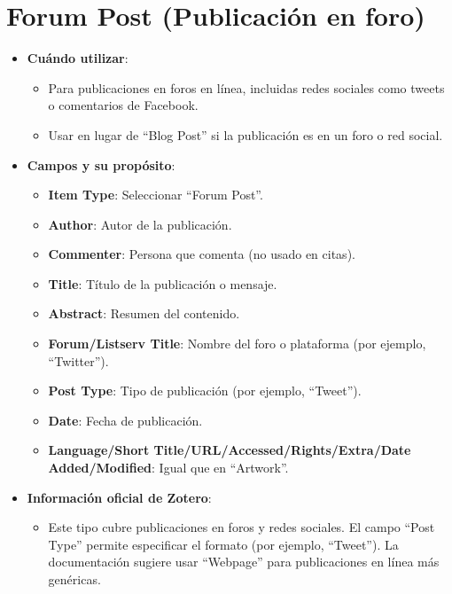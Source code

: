 \documentclass[
  jou,
  floatsintext,
  longtable,
  a4paper,
  nolmodern,
  notxfonts,
  notimes,
  12pt,
  colorlinks=true,linkcolor=blue,citecolor=blue,urlcolor=blue]{apa7}
\providecommand{\tightlist}{%
  \setlength{\itemsep}{0pt}\setlength{\parskip}{0pt}}
\begin{document}
\section{Forum Post (Publicación en
foro)}\label{forum-post-publicaciuxf3n-en-foro}

\begin{itemize}
\tightlist
\item
  \textbf{Cuándo utilizar}:

  \begin{itemize}
  \tightlist
  \item
    Para publicaciones en foros en línea, incluidas redes sociales como
    tweets o comentarios de Facebook.
  \item
    Usar en lugar de ``Blog Post'' si la publicación es en un foro o red
    social.
  \end{itemize}
\item
  \textbf{Campos y su propósito}:

  \begin{itemize}
  \tightlist
  \item
    \textbf{Item Type}: Seleccionar ``Forum Post''.
  \item
    \textbf{Author}: Autor de la publicación.
  \item
    \textbf{Commenter}: Persona que comenta (no usado en citas).
  \item
    \textbf{Title}: Título de la publicación o mensaje.
  \item
    \textbf{Abstract}: Resumen del contenido.
  \item
    \textbf{Forum/Listserv Title}: Nombre del foro o plataforma (por
    ejemplo, ``Twitter'').
  \item
    \textbf{Post Type}: Tipo de publicación (por ejemplo, ``Tweet'').
  \item
    \textbf{Date}: Fecha de publicación.
  \item
    \textbf{Language/Short Title/URL/Accessed/Rights/Extra/Date
    Added/Modified}: Igual que en ``Artwork''.
  \end{itemize}
\item
  \textbf{Información oficial de Zotero}:

  \begin{itemize}
  \tightlist
  \item
    Este tipo cubre publicaciones en foros y redes sociales. El campo
    ``Post Type'' permite especificar el formato (por ejemplo,
    ``Tweet''). La documentación sugiere usar ``Webpage'' para
    publicaciones en línea más genéricas.
  \end{itemize}
\end{itemize}
\end{document}
